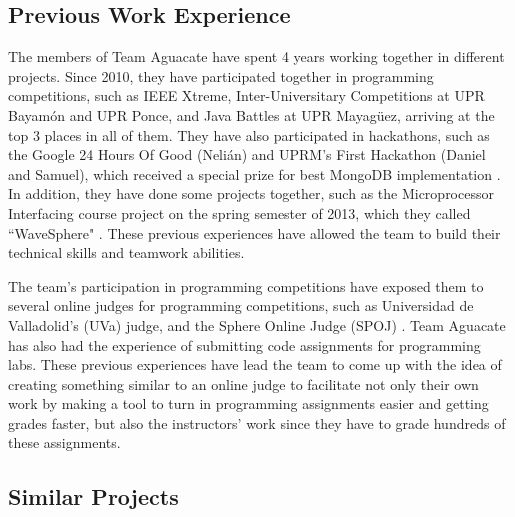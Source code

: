
\subsection{Previous Work Experience}

The members of Team Aguacate have spent 4 years working together in different
projects. Since 2010, they have participated together in programming
competitions, such as IEEE Xtreme, Inter-Universitary Competitions at UPR
Bayamón and UPR Ponce, and Java Battles at UPR Mayagüez, arriving at the top 3
places in all of them. They have also participated in hackathons, such as the
Google 24 Hours Of Good (Nelián) and UPRM's First Hackathon \cite{hack1} (Daniel and Samuel),
which received a special prize for  best MongoDB implementation \cite{hack2}.
In addition, they have done some projects together, such as the Microprocessor
Interfacing course project on the spring semester of 2013, which they called
``WaveSphere" \cite{Micro2}. These previous experiences have allowed the team to
build their technical skills and teamwork abilities.

The team's participation in programming competitions have exposed them to
several  online judges for programming competitions, such as Universidad de
Valladolid's (UVa) judge, \cite{UVA} and the Sphere Online Judge (SPOJ)
\cite{SPOJ}. Team Aguacate has also had the experience of submitting code
assignments for programming labs. These previous experiences have lead the team
to come up with the idea of creating something similar to an online judge to
facilitate not only their own work by making a tool to turn in programming
assignments easier and getting grades faster, but also the instructors' work
since they have to grade hundreds of these assignments.

\subsection{Similar Projects}

